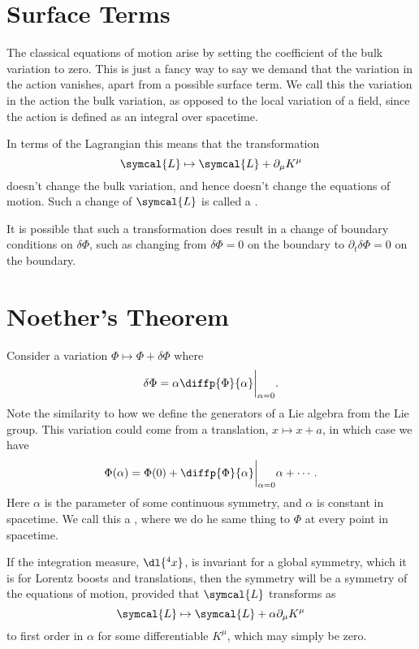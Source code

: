 \documentclass[fleqn]{NotesClass}
\newcommand{\lagrangianDensity}{\symcal{L}}
\begin{document}
    \section{Surface Terms}
    The classical equations of motion arise by setting the coefficient of the bulk variation to zero.
    This is just a fancy way to say we demand that the variation in the action vanishes, apart from a possible surface term.
    We call this the variation in the action the bulk variation, as opposed to the local variation of a field, since the action is defined as an integral over spacetime.
    
    In terms of the Lagrangian this means that the transformation
    \begin{equation}
        \lagrangianDensity \mapsto \lagrangianDensity + \partial_\mu K^\mu
    \end{equation}
    doesn't change the bulk variation, and hence doesn't change the equations of motion.
    Such a change of \(\lagrangianDensity\) is called a .
    
    It is possible that such a transformation does result in a change of boundary conditions on \(\delta \Phi\), such as changing from \(\delta\Phi = 0\) on the boundary to \(\partial_t \delta\Phi = 0\) on the boundary.
    
    \section{Noether's Theorem}
    Consider a variation \(\Phi \mapsto \Phi + \delta \Phi\) where
    \begin{equation}
        \delta \Phi = \alpha \diffp{\Phi}{\alpha} \bigg|_{\alpha = 0}.
    \end{equation}
    Note the similarity to how we define the generators of a Lie algebra from the Lie group.
    This variation could come from a translation, \(x \mapsto x + a\), in which case we have
    \begin{equation}
        \Phi(\alpha) = \Phi(0) + \diffp{\Phi}{\alpha} \bigg|_{\alpha = 0} \alpha + \dotsb.
    \end{equation}
    Here \(\alpha\) is the parameter of some continuous symmetry, and \(\alpha\) is constant in spacetime.
    We call this a , where we do he same thing to \(\Phi\) at every point in spacetime.
    
    If the integration measure, \(\dl{^4x}\), is invariant for a global symmetry, which it is for Lorentz boosts and translations, then the symmetry will be a symmetry of the equations of motion, provided that \(\lagrangianDensity\) transforms as
    \begin{equation}
        \lagrangianDensity \mapsto \lagrangianDensity + \alpha\partial_\mu K^\mu
    \end{equation}
    to first order in \(\alpha\) for some differentiable \(K^\mu\), which may simply be zero.
    
\end{document}
